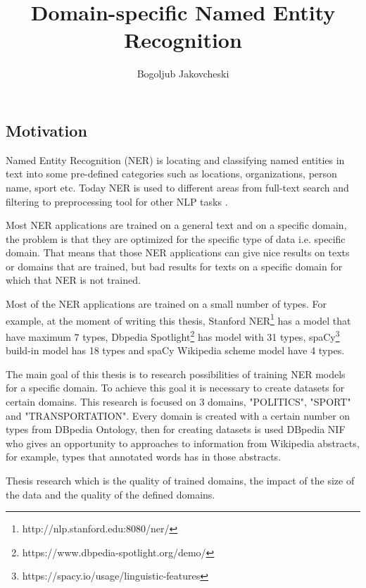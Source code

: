 \documentclass[thesis=M,english]{FITthesis}[2018/05/30]
\title{Domain-specific Named Entity Recognition}
\author{Bogoljub Jakovcheski} %
\begin{document}

\begin{introduction}

\section{Motivation}
    Named Entity Recognition (NER)\cite{wiki:NER} is locating and classifying named entities in text into some pre-defined categories such as locations, organizations, person name, sport etc. Today NER is used to different areas from full-text search and filtering to preprocessing tool for other NLP tasks \cite{master:NER}.  	
		
    Most NER applications are trained on a general text and on a specific domain, the problem is that they are optimized for the specific type of data i.e. specific domain. That means that those NER applications can give nice results on texts or domains that are trained, but bad results for texts on a specific domain for which that NER is not trained.
	  
    Most of the NER applications are trained on a small number of types. For example, at the moment of writing this thesis, Stanford NER\footnote{http://nlp.stanford.edu:8080/ner/} has a model that have maximum 7 types, Dbpedia Spotlight\footnote{https://www.dbpedia-spotlight.org/demo/} has model with 31 types, spaCy\footnote{https://spacy.io/usage/linguistic-features} build-in model has 18 types and spaCy Wikipedia scheme model have 4 types.
	  
	The main goal of this thesis is to research possibilities of training NER models for a specific domain. To achieve this goal it is necessary to create datasets for certain domains. This research is focused on 3 domains, "POLITICS", "SPORT" and "TRANSPORTATION". Every domain is created with a certain number on types from DBpedia Ontology, then for creating datasets is used DBpedia NIF who gives an opportunity to approaches to information from Wikipedia abstracts, for example, types that annotated words has in those abstracts.
	  
	  Thesis research which is the quality of trained domains, the impact of the size of the data and the quality of the defined domains.
	  
	  

\end{introduction}
\end{document}

